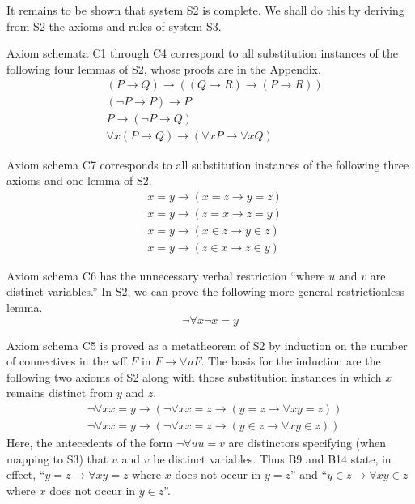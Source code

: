 \documentclass[leqno]{article}
\begin{document}
     It remains to be shown that system S2 is complete.  We shall do this by
deriving from S2 the axioms and rules of system S3.

     Axiom schemata C1 through C4 correspond to all substitution instances of
the following four lemmas of S2, whose proofs are in the Appendix.
\setcounter{equation}{0}
\renewcommand{\theequation}{\ifcase\value{equation} \or
   L13\or
   L14\or
   L15\or
   L16\or
   B8\or
   L17\or
   B12\or
   B13\or
   L18\or
   B9\or
   B14\or
   L19\or
   L20\or
   L21\or
   L22\or
   ? \else ? \fi}
\begin{eqnarray} %
  & (P\rightarrow Q)\rightarrow ((Q\rightarrow R)\rightarrow
(P\rightarrow R)) \\
  & (\lnot P\rightarrow P)\rightarrow P \\
  & P\rightarrow (\lnot P\rightarrow Q) \\
  & \forall x(P\rightarrow Q)\rightarrow (\forall xP\rightarrow \forall
      xQ)
\end{eqnarray}

     Axiom schema C7 corresponds to all substitution instances of the
following three axioms and one lemma of S2.
\begin{eqnarray} %
  & x=y\rightarrow (x=z\rightarrow y=z) \\
  & x=y\rightarrow (z=x\rightarrow z=y) \\
  & x=y\rightarrow (x\in z\rightarrow y\in z) \\
  & x=y\rightarrow (z\in x\rightarrow z\in y)
\end{eqnarray}

     Axiom schema C6 has the unnecessary verbal restriction ``where $u$ and
$v$ are distinct variables.''  In S2, we can prove the following more general
restrictionless lemma.
\begin{equation} %
  \lnot \forall x\lnot x=y
\end{equation}

     Axiom schema C5 is proved as a metatheorem of S2 by induction on the
number of connectives in the wff $F$ in $F\rightarrow \forall uF$.  The basis
for the induction are the following two axioms of S2 along with those
substitution instances in which $x$ remains distinct from $y$ and $z$.
\begin{eqnarray} %
  & \lnot \forall xx=y\rightarrow (\lnot \forall xx=z\rightarrow
    (y=z\rightarrow \forall xy=z)) \\
  & \lnot \forall xx=y\rightarrow (\lnot \forall xx=z\rightarrow (y\in
    z\rightarrow \forall xy\in z))
\end{eqnarray}
Here, the antecedents of the form $\lnot \forall uu=v$ are distinctors
specifying (when mapping to S3) that $u$ and $v$ be distinct variables.  Thus
B9 and B14 state, in effect, ``$y=z\rightarrow \forall xy=z$ where $x$ does
not occur in $y=z$'' and ``$y\in z\rightarrow \forall xy\in z$ where $x$ does
not occur in $y\in z$''.
\end{document}
